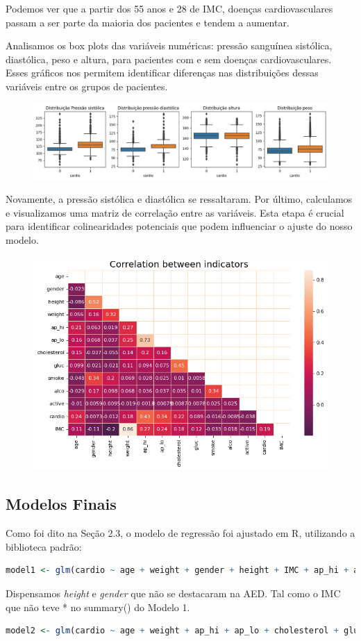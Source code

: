 \documentclass[article,11pt,a4paper,brazil]{abntex2}
\begin{document}
	Podemos ver que a partir dos 55 anos e 28 de IMC, doenças cardiovasculares passam a ser parte da maioria dos pacientes e tendem a aumentar.
	
	Analisamos os box plots das variáveis numéricas: pressão sanguínea sistólica, diastólica, peso e altura, para pacientes com e sem doenças cardiovasculares. Esses gráficos nos permitem identificar diferenças nas distribuições dessas variáveis entre os grupos de pacientes.
	\begin{figure}[H]
		\centering
		\includegraphics[width=1\linewidth]{Images/boxplots.png}
	\end{figure}
	
	Novamente, a pressão sistólica e diastólica se ressaltaram. Por último, calculamos e visualizamos uma matriz de correlação entre as variáveis. Esta etapa é crucial para identificar colinearidades potenciais que podem influenciar o ajuste do nosso modelo.
	\begin{figure}[H]
		\centering
		\includegraphics[width=0.75\linewidth]{Images/corr.png}
	\end{figure}
	
	\subsection{Modelos Finais}
	Como foi dito na Seção 2.3, o modelo de regressão foi ajustado em R, utilizando a biblioteca padrão:
	\begin{lstlisting}[language=R]
model1 <- glm(cardio ~ age + weight + gender + height + IMC + ap_hi + ap_lo + cholesterol + gluc + smoke + alco + active,data = train, family = binomial)
	\end{lstlisting}
Dispensamos \textit{height} e \textit{gender} que não se destacaram na AED. Tal como o IMC que não teve * no summary() do Modelo 1.
	\begin{lstlisting}[language=R]
model2 <- glm(cardio ~ age + weight + ap_hi + ap_lo + cholesterol + gluc + smoke + alco + active, data = train, family = binomial)
	\end{lstlisting}
\end{document}
